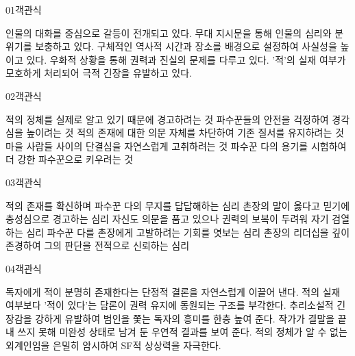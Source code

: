 \documentclass[fs85,seriesWit]{korfarm-base}
\begin{document}
\kfBeginMC
\begin{kfQBlock}{01}{객관식}
\begin{kfChoices}
\kfChoice 인물의 대화를 중심으로 갈등이 전개되고 있다.
\kfChoice 무대 지시문을 통해 인물의 심리와 분위기를 보충하고 있다.
\kfChoice 구체적인 역사적 시간과 장소를 배경으로 설정하여 사실성을 높이고 있다.
\kfChoice 우화적 상황을 통해 권력과 진실의 문제를 다루고 있다.
\kfChoice '적'의 실재 여부가 모호하게 처리되어 극적 긴장을 유발하고 있다.
\end{kfChoices}
\end{kfQBlock}

\begin{kfQBlock}{02}{객관식}
\begin{kfChoices}
\kfChoice 적의 정체를 실제로 알고 있기 때문에 경고하려는 것
\kfChoice 파수꾼들의 안전을 걱정하여 경각심을 높이려는 것
\kfChoice 적의 존재에 대한 의문 자체를 차단하여 기존 질서를 유지하려는 것
\kfChoice 마을 사람들 사이의 단결심을 자연스럽게 고취하려는 것
\kfChoice 파수꾼 다의 용기를 시험하여 더 강한 파수꾼으로 키우려는 것
\end{kfChoices}
\end{kfQBlock}

\begin{kfQBlock}{03}{객관식}
\begin{kfChoices}
\kfChoice 적의 존재를 확신하며 파수꾼 다의 무지를 답답해하는 심리
\kfChoice 촌장의 말이 옳다고 믿기에 충성심으로 경고하는 심리
\kfChoice 자신도 의문을 품고 있으나 권력의 보복이 두려워 자기 검열하는 심리
\kfChoice 파수꾼 다를 촌장에게 고발하려는 기회를 엿보는 심리
\kfChoice 촌장의 리더십을 깊이 존경하여 그의 판단을 전적으로 신뢰하는 심리
\end{kfChoices}
\end{kfQBlock}

\begin{kfQBlock}{04}{객관식}
\begin{kfChoices}
\kfChoice 독자에게 적이 분명히 존재한다는 단정적 결론을 자연스럽게 이끌어 낸다.
\kfChoice 적의 실재 여부보다 '적이 있다'는 담론이 권력 유지에 동원되는 구조를 부각한다.
\kfChoice 추리소설적 긴장감을 강하게 유발하여 범인을 쫓는 독자의 흥미를 한층 높여 준다.
\kfChoice 작가가 결말을 끝내 쓰지 못해 미완성 상태로 남겨 둔 우연적 결과를 보여 준다.
\kfChoice 적의 정체가 알 수 없는 외계인임을 은밀히 암시하여 SF적 상상력을 자극한다.
\end{kfChoices}
\end{kfQBlock}
\end{document}
